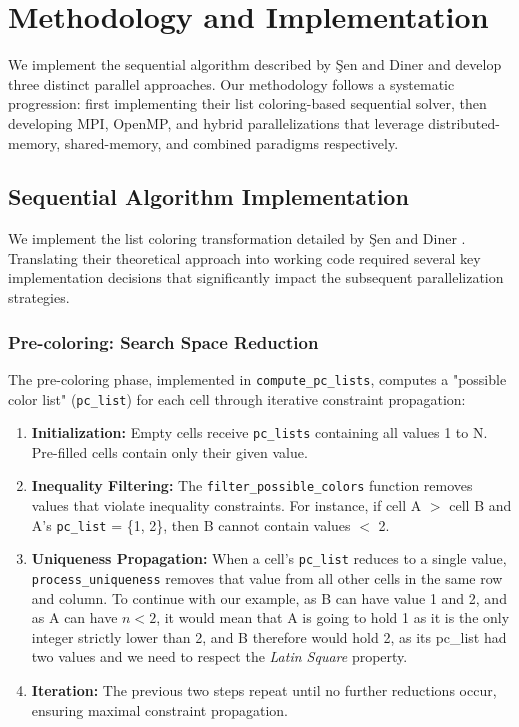 \section{Methodology and Implementation}
\label{sec:solution}

We implement the sequential algorithm described by Şen and Diner \cite{Sen2024Futoshiki} and develop three distinct parallel approaches. Our methodology follows a systematic progression: first implementing their list coloring-based sequential solver, then developing MPI, OpenMP, and hybrid parallelizations that leverage distributed-memory, shared-memory, and combined paradigms respectively.

\subsection{Sequential Algorithm Implementation}
\label{subsec:paper_implementation}
We implement the list coloring transformation detailed by Şen and Diner \cite{Sen2024Futoshiki}. Translating their theoretical approach into working code required several key implementation decisions that significantly impact the subsequent parallelization strategies.

\subsubsection{Pre-coloring: Search Space Reduction}
\label{subsubsec:precoloring}
The pre-coloring phase, implemented in \texttt{compute\_pc\_lists}, computes a "possible color list" (\texttt{pc\_list}) for each cell through iterative constraint propagation:

\begin{enumerate}
    \item \textbf{Initialization:} Empty cells receive \texttt{pc\_lists} containing all values 1 to N. Pre-filled cells contain only their given value.
    
    \item \textbf{Inequality Filtering:} The \texttt{filter\_possible\_colors} function removes values that violate inequality constraints. For instance, if cell A $>$ cell B and A's \texttt{pc\_list} = \{1, 2\}, then B cannot contain values $<$ 2.
    
    \item \textbf{Uniqueness Propagation:} When a cell's \texttt{pc\_list} reduces to a single value, \texttt{process\_uniqueness} removes that value from all other cells in the same row and column. To continue with our example, as B can have value 1 and 2, and as A can have $n < 2$, it would mean that A is going to hold 1 as it is the only integer strictly lower than 2, and B therefore would hold 2, as its pc\_list had two values and we need to respect the \textit{Latin Square} property.
    
    \item \textbf{Iteration:} The previous two steps repeat until no further reductions occur, ensuring maximal constraint propagation.
\end{enumerate}

